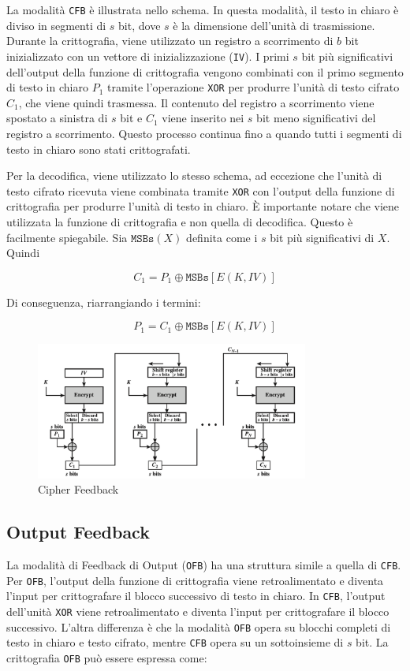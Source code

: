La modalità \verb|CFB| è illustrata nello schema. In questa modalità, il testo in chiaro
è diviso in segmenti di \(s\) bit, dove \(s\) è la dimensione dell'unità di
trasmissione. Durante la crittografia, viene utilizzato un registro a scorrimento
di \(b\) bit inizializzato con un vettore di inizializzazione (\verb|IV|). I
primi \(s\) bit più significativi dell'output della funzione di crittografia
vengono combinati con il primo segmento di testo in chiaro \(P_1\) tramite
l'operazione \texttt{XOR} per produrre l'unità di testo cifrato \(C_1\), che viene quindi
trasmessa. Il contenuto del registro a scorrimento viene spostato a sinistra di
\(s\) bit e \(C_1\) viene inserito nei \(s\) bit meno significativi del registro
a scorrimento. Questo processo continua fino a quando tutti i segmenti di testo
in chiaro sono stati crittografati.

Per la decodifica, viene utilizzato lo stesso schema, ad eccezione che l'unità
di testo cifrato ricevuta viene combinata tramite \verb|XOR| con l'output della funzione
di crittografia per produrre l'unità di testo in chiaro. È importante notare che
viene utilizzata la funzione di crittografia e non quella di decodifica. Questo
è facilmente spiegabile. Sia \(\texttt{MSBs}(X)\) definita come i \(s\) bit più significativi
di \(X\). Quindi

\[ C_1 = P_1 \oplus \texttt{MSBs}[E(K, IV)] \]

Di conseguenza, riarrangiando i termini:

\[ P_1 = C_1 \oplus \texttt{MSBs}[E(K, IV)] \]
\begin{figure}[H]
    \centering
    \includegraphics[width=0.8\textwidth]{img/cipherFeedback.png}
    \caption{Cipher Feedback}
\end{figure}
\subsection{Output Feedback}
La modalità di Feedback di Output (\verb|OFB|) ha una struttura simile a
quella di \verb|CFB|. Per \verb|OFB|, l'output della funzione di crittografia viene
retroalimentato e diventa l'input per crittografare il blocco successivo
di testo in chiaro. In \verb|CFB|, l'output dell'unità \verb|XOR| viene
retroalimentato e diventa l'input per crittografare il blocco successivo.
L'altra differenza è che la modalità \verb|OFB| opera su blocchi completi
di testo
in chiaro e testo cifrato, mentre \verb|CFB| opera su un sottoinsieme di \(s\) bit.
La crittografia \verb|OFB| può essere espressa come:

